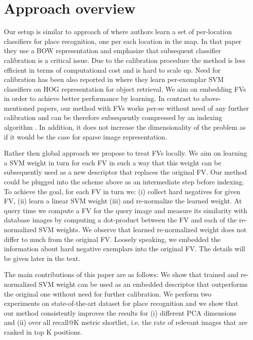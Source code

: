 \documentclass[table]{article} %
\begin{document}
\section{Approach overview}
	Our setup is similar to approach of \cite{Gronat2013} where authors learn a set of per-location classifiers for place recognition, one per each location in the map. In that paper they use a BOW representation and emphasize that subsequent classifier calibration is a critical issue.  Due to the calibration procedure the method is less efficient in terms of computational cost and is hard to scale up. Need for calibration has been also reported in \cite{Malisiewicz11} where they learn per-exemplar SVM classifiers on HOG representation for object retrieval. 
	We aim on embedding FVs in order to achieve better performance by learning. In contrast to above-mentioned papers, our method with FVs works per-se without need of any further calibration and can be therefore subsequently compressed by an indexing algorithm \cite{Jegou2011}. In addition, it does not increase the dimensionality of the problem as if it would be the case for sparse image representation.

 	Rather then global approach we propose to treat FVs locally. We aim on learning a SVM weight in turn for each FV in such a way that this weight can be subsequently used as a new descriptor that replaces the original FV. Our method could be plugged into the scheme above as an intermediate step before indexing. To achieve the goal, for each FV in turn we: (i) collect hard negatives for given FV, (ii) learn a linear SVM weight (iii) and re-normalize the learned weight. At query time we compute a FV for the query image and measure its similarity with database images by computing a dot-product between the FV and each of the re-normalized SVM weights. We observe that learned re-normalized weight does not differ to much from the original FV. Loosely speaking, we embedded the information about hard negative exemplars into the original FV. The details will be given later in the text.

 	
	The main contributions of this paper are as follows: 
	We show that trained and re-normalized SVM weight can be used as an embedded descriptor that outperforms the original one without need for further calibration. We perform two experiments on state-of-the-art dataset for place recognition and we show that our method consistently improves the results for (i) different PCA dimensions and (ii) over all recall@K metric shortlist, i.e. the rate of relevant images that are ranked in top K positions.
\end{document}
